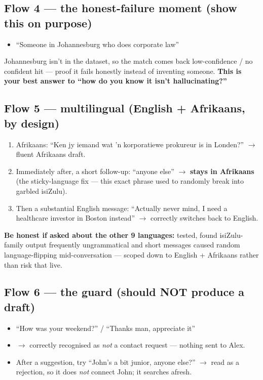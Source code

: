 \documentclass[11pt, a4paper]{article}
\begin{document}
\subsection{Flow 4 --- the honest-failure moment (show this on purpose)}
\begin{itemize}
    \item ``Someone in Johannesburg who does corporate law''
\end{itemize}
Johannesburg isn't in the dataset, so the match comes back low-confidence / no confident hit --- proof it fails honestly instead of inventing someone. \textbf{This is your best answer to ``how do you know it isn't hallucinating?''}

\subsection{Flow 5 --- multilingual (English + Afrikaans, by design)}
\begin{enumerate}
    \item Afrikaans: ``Ken jy iemand wat 'n korporatiewe prokureur is in Londen?'' $\rightarrow$ fluent Afrikaans draft.
    \item Immediately after, a short follow-up: ``anyone else'' $\rightarrow$ \textbf{stays in Afrikaans} (the sticky-language fix --- this exact phrase used to randomly break into garbled isiZulu).
    \item Then a substantial English message: ``Actually never mind, I need a healthcare investor in Boston instead'' $\rightarrow$ correctly switches back to English.
\end{enumerate}
\textbf{Be honest if asked about the other 9 languages:} tested, found isiZulu-family output frequently ungrammatical and short messages caused random language-flipping mid-conversation --- scoped down to English + Afrikaans rather than risk that live.

\subsection{Flow 6 --- the guard (should NOT produce a draft)}
\begin{itemize}
    \item ``How was your weekend?'' \quad / \quad ``Thanks man, appreciate it''
    \item[] $\rightarrow$ correctly recognised as \emph{not} a contact request --- nothing sent to Alex.
    \item After a suggestion, try ``John's a bit junior, anyone else?'' $\rightarrow$ read as a rejection, so it does \emph{not} connect John; it searches afresh.
\end{itemize}
\end{document}
